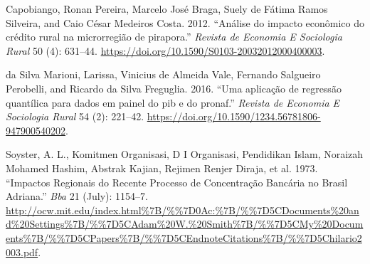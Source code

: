 \documentclass[12pt,english, french, spanish, brazil,a4paper,twoside, openright]{abntex2}	%
\begin{document}
\leavevmode\hypertarget{ref-Capobiango2012}{}%
Capobiango, Ronan Pereira, Marcelo José Braga, Suely de Fátima Ramos
Silveira, and Caio César Medeiros Costa. 2012. ``Análise do impacto
econômico do crédito rural na microrregião de pirapora.'' \emph{Revista
de Economia E Sociologia Rural} 50 (4): 631--44.
\url{https://doi.org/10.1590/S0103-20032012000400003}.

\leavevmode\hypertarget{ref-DaSilvaMarioni2016}{}%
da Silva Marioni, Larissa, Vinicius de Almeida Vale, Fernando Salgueiro
Perobelli, and Ricardo da Silva Freguglia. 2016. ``Uma aplicação de
regressão quantílica para dados em painel do pib e do pronaf.''
\emph{Revista de Economia E Sociologia Rural} 54 (2): 221--42.
\url{https://doi.org/10.1590/1234.56781806-947900540202}.

\leavevmode\hypertarget{ref-Soyster1973a}{}%
Soyster, A. L., Komitmen Organisasi, D I Organisasi, Pendidikan Islam,
Noraizah Mohamed Hashim, Abstrak Kajian, Rejimen Renjer Diraja, et al.
1973. ``Impactos Regionais do Recente Processo de Concentração Bancária
no Brasil Adriana.'' \emph{Bba} 21 (July): 1154--7.
\url{http://ocw.mit.edu/index.html\%7B/\%\%7D0Ac:\%7B/\%\%7D5CDocuments\%20and\%20Settings\%7B/\%\%7D5CAdam\%20W.\%20Smith\%7B/\%\%7D5CMy\%20Documents\%7B/\%\%7D5CPapers\%7B/\%\%7D5CEndnoteCitations\%7B/\%\%7D5Chilario2003.pdf}.	%



\printbibliography
\end{document}
